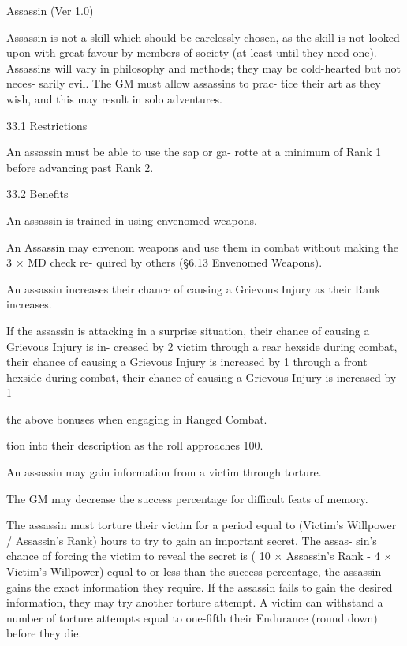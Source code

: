 \begin{Chapter}{Assassin (Ver 1.0)}

Assassin  is  not  a  skill  which  should  be  carelessly 
chosen,  as  the  skill  is  not  looked  upon  with  great 
favour  by  members  of  society  (at  least  until  they 
need  one).  Assassins  will  vary  in  philosophy  and 
methods;  they  may  be  cold-hearted  but  not  neces-
sarily  evil.  The  GM  must  allow  assassins  to  prac-
tice  their  art  as  they  wish,  and  this  may  result  in 
solo adventures. 

33.1 Restrictions 

An  assassin  must  be  able  to  use  the  sap  or  ga-
rotte at a minimum of Rank 1 before advancing 
past Rank 2. 

33.2 Benefits 

An  assassin  is  trained  in  using  envenomed 
weapons. 

An Assassin may envenom weapons and use them 
in  combat  without  making  the  3  ×  MD  check  re-
quired by others (§6.13 Envenomed Weapons). 

An  assassin  increases  their  chance  of  causing  a 
Grievous Injury as their Rank increases. 

If  the  assassin  is  attacking  in  a  surprise  situation, 
their  chance  of  causing  a  Grievous  Injury  is  in-
creased  by  2%
victim through a rear hexside during combat, their 
chance of causing a Grievous Injury is increased by 
1%
through  a  front  hexside  during  combat,  their 
chance of causing a Grievous Injury is increased by 
1%

the  above  bonuses  when  engaging  in  Ranged 
Combat. 

tion  into  their  description  as  the  roll  approaches 
100. 

An assassin may gain information from a victim 
through torture. 

The  GM  may  decrease  the  success  percentage  for 
difficult feats of memory. 

The  assassin  must  torture  their  victim for  a  period 
equal  to  (Victim’s  Willpower  /  Assassin’s  Rank) 
hours to try to gain an important secret. The assas-
sin’s  chance  of  forcing  the  victim  to  reveal  the 
secret  is  (  10  ×  Assassin’s  Rank  -  4  ×  Victim’s 
Willpower)%
equal  to  or  less  than  the  success  percentage,  the 
assassin gains the exact information they require. If 
the  assassin  fails  to  gain  the  desired  information, 
they may try another torture attempt. A victim can 
withstand  a  number  of  torture  attempts  equal  to 
one-fifth their Endurance (round down) before they 
die. 


\end{Chapter}
